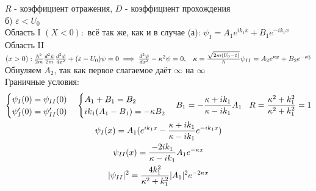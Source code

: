 \documentclass[__main__.tex]{subfiles}
\begin{document}
$R$ - коэффициент отражения, $D$ - коэффициент прохождения\\
б) $\varepsilon < U_0$ \\
Область I $(X<0):$ всё так же, как и в случае (а): $\psi_I = A_1e^{ik_1x} + B_1e^{-ik_1x}$\\
Область II $(x>0): \frac{\hbar^2}{2m}\frac{d^2\psi}{2m}\frac{d^2\psi}{dx^2} + (\varepsilon - U_0)\psi = 0 \implies \frac{d^2\psi}{dx^2} - \kappa^2\psi = 0, \hspace{0.3cm} \kappa = \frac{\sqrt{2m(U_0-\varepsilon)}}{\hbar}\\\\
\psi_{II} = A_2e^{\mathcal{\kappa} x} + B_2e^{-\mathcal{\kappa x}}$ \\
Обнуляем $A_2$, так как первое слагаемое даёт $\infty$ на $\infty$\\
Граничные условия:
\begin{gather*}
\begin{cases}
\psi_I(0) = \psi_{II}(0)\\
\psi'_{I}(0) = \psi'_{II}(0)
\end{cases}
\begin{cases}
A_1 + B_1 = B_2\\
ik_1(A_1 - B_1) = -\mathcal{\kappa}B_2\\
\end{cases}
B_1 = -\frac{\mathcal{\kappa} + ik_1}{\mathcal{\kappa} - ik_1}A_1 \hspace{0.3cm} R = \frac{\mathcal{\kappa}^2 + k_1^2}{\mathcal{\kappa}^2 + k_1^2} = 1\\
\psi_I(x) = A_1(e^{ik_1x} - \frac{\mathcal{\kappa} + ik_1}{\mathcal{\kappa} - ik_1}e^{-ik_1x})\\
\psi_{II}(x) = \frac{-2ik_1}{\mathcal{\kappa} - ik_1}A_1e^{-\mathcal{\kappa}x}\\
|\psi_{II}|^2 = \frac{4k_1^2}{\mathcal{\kappa}^2 + k_1^2}|A_1|^2e^{-2\mathcal{\kappa}x}
\end{gather*}
\end{document}
